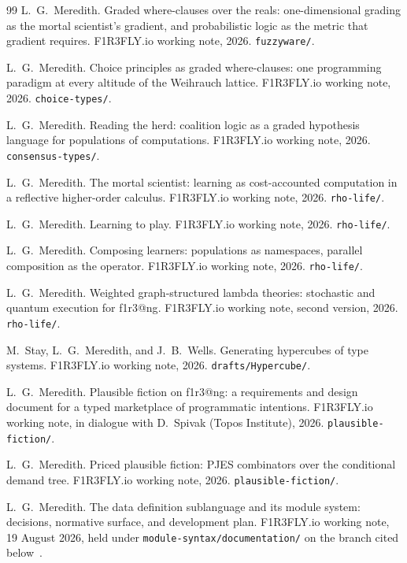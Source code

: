\documentclass[11pt]{article}
\makeatletter
\theoremstyle{definition}
\theoremstyle{plain}
\theoremstyle{remark}
\newcommand{\flang}{\textsf{f1r3\textbar @ng}}
\makeatother
\begin{document}
\begin{thebibliography}{99}
L.~G.~Meredith.
\newblock Graded where-clauses over the reals: one-dimensional grading as the
mortal scientist's gradient, and probabilistic logic as the metric that
gradient requires.
\newblock F1R3FLY.io working note, 2026. \texttt{fuzzyware/}.

L.~G.~Meredith.
\newblock Choice principles as graded where-clauses: one programming paradigm
at every altitude of the Weihrauch lattice.
\newblock F1R3FLY.io working note, 2026. \texttt{choice-types/}.

L.~G.~Meredith.
\newblock Reading the herd: coalition logic as a graded hypothesis language for
populations of computations.
\newblock F1R3FLY.io working note, 2026. \texttt{consensus-types/}.

L.~G.~Meredith.
\newblock The mortal scientist: learning as cost-accounted computation in a
reflective higher-order calculus.
\newblock F1R3FLY.io working note, 2026. \texttt{rho-life/}.

L.~G.~Meredith.
\newblock Learning to play.
\newblock F1R3FLY.io working note, 2026. \texttt{rho-life/}.

L.~G.~Meredith.
\newblock Composing learners: populations as namespaces, parallel composition
as the operator.
\newblock F1R3FLY.io working note, 2026. \texttt{rho-life/}.

L.~G.~Meredith.
\newblock Weighted graph-structured lambda theories: stochastic and quantum
execution for \flang{}.
\newblock F1R3FLY.io working note, second version, 2026. \texttt{rho-life/}.

M.~Stay, L.~G.~Meredith, and J.~B.~Wells.
\newblock Generating hypercubes of type systems.
\newblock F1R3FLY.io working note, 2026. \texttt{drafts/Hypercube/}.

L.~G.~Meredith.
\newblock Plausible fiction on \flang{}: a requirements and design document for
a typed marketplace of programmatic intentions.
\newblock F1R3FLY.io working note, in dialogue with D.~Spivak (Topos
Institute), 2026. \texttt{plausible-fiction/}.

L.~G.~Meredith.
\newblock Priced plausible fiction: PJES combinators over the conditional
demand tree.
\newblock F1R3FLY.io working note, 2026. \texttt{plausible-fiction/}.

L.~G.~Meredith.
\newblock The data definition sublanguage and its module system: decisions,
normative surface, and development plan.
\newblock F1R3FLY.io working note, 19 August 2026, held under
\texttt{module-syntax/documentation/} on the branch cited
below~\cite{modulesyntax}.


\end{thebibliography}
\end{document}
